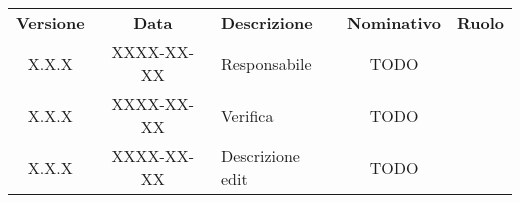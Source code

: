 
\renewcommand{\arraystretch}{1.5}
\centering
\begin{longtable}{ c c  C{4cm}  c  c }
    \rowcolor{\primaryColor}
    \textcolor{\secondaryColor}{
    \textbf{Versione}}     & \textcolor{\secondaryColor}{\textbf{Data}}       & \textcolor{\secondaryColor}
    {\textbf{Descrizione}} & \textcolor{\secondaryColor}{\textbf{Nominativo}} & \textcolor{\secondaryColor}{\textbf{Ruolo}}                          \\


    X.X.X                  & XXXX-XX-XX                                       & Responsabile                                & TODO & \responsabile{} \\
    X.X.X                  & XXXX-XX-XX                                       & Verifica                                    & TODO & \verificatore{} \\
    X.X.X                  & XXXX-XX-XX                                       & Descrizione edit                            & TODO & \redattore{}    \\
\end{longtable}
